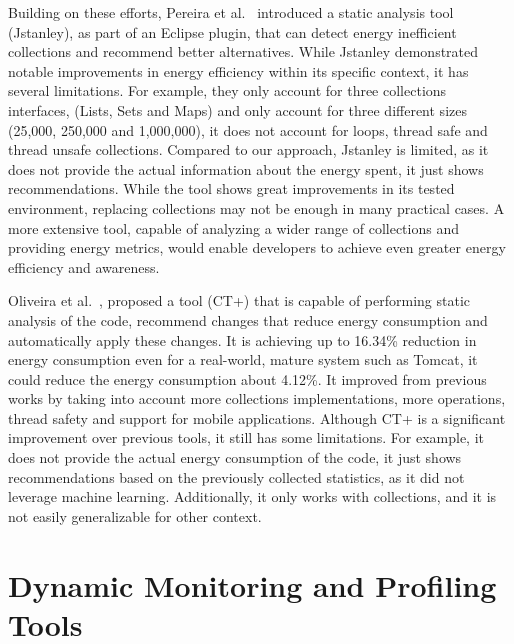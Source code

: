 Building on these efforts, Pereira et al.~\cite{10.1145/3238147.3240473} introduced a static analysis tool (Jstanley), as part of an Eclipse plugin, that can detect energy inefficient collections and recommend better alternatives. While Jstanley demonstrated notable improvements in energy efficiency within its specific context, it has several limitations.
For example, they only account for three collections interfaces, (Lists, Sets and Maps) and only account for three different sizes (25,000, 250,000 and 1,000,000), it does not account for loops, thread safe and thread unsafe collections. Compared to our approach, Jstanley is limited, as it does not provide the actual information about the energy spent, it just shows recommendations. While the tool shows great improvements in its tested environment, replacing collections may not be enough in many practical cases. A more extensive tool, capable of analyzing a wider range of collections and providing energy metrics, would enable developers to achieve even greater energy efficiency and awareness.

Oliveira et al.~\cite{8816747}, proposed a tool (CT+) that is capable of performing static analysis of the code, recommend changes that reduce energy consumption and automatically apply these changes. It is achieving up to 16.34\% reduction in energy consumption even for a real-world, mature system such as Tomcat, it could reduce the energy consumption about 4.12\%. It improved from previous works by taking into account more collections implementations, more operations, thread safety and support for mobile applications. Although CT+ is a significant improvement over previous tools, it still has some limitations. For example, it does not provide the actual energy consumption of the code, it just shows recommendations based on the previously collected statistics, as it did not leverage machine learning. Additionally, it only works with collections, and it is not easily generalizable for other context. 


\section{Dynamic Monitoring and Profiling Tools}

